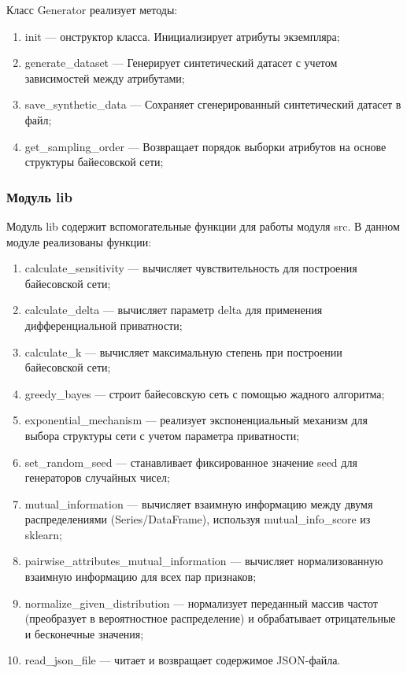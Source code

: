 Класс Generator реализует методы:

\begin{enumerate}[label*=---]
	\item init --- онструктор класса. Инициализирует атрибуты экземпляра;
	\item generate\_dataset --- Генерирует синтетический датасет с учетом зависимостей между атрибутами;
	\item save\_synthetic\_data --- Сохраняет сгенерированный синтетический датасет в файл;
	\item get\_sampling\_order --- Возвращает порядок выборки атрибутов на основе структуры байесовской сети;
\end{enumerate}

\subsubsection{Модуль lib}

Модуль lib содержит вспомогательные функции для работы модуля src.
В данном модуле реализованы функции:
\begin{enumerate}[label*=---]
	
	\item calculate\_sensitivity --- вычисляет чувствительность для построения байесовской сети;
	\item calculate\_delta --- вычисляет параметр delta для применения дифференциальной приватности;
	\item calculate\_k --- вычисляет максимальную степень при построении байесовской сети;
	\item greedy\_bayes --- строит байесовскую сеть с помощью жадного алгоритма;
	\item exponential\_mechanism --- реализует экспоненциальный механизм для выбора структуры сети с учетом параметра приватности;

	\item set\_random\_seed --- станавливает фиксированное значение seed для генераторов случайных чисел;
	\item mutual\_information --- вычисляет взаимную информацию между двумя распределениями (Series/DataFrame), используя mutual\_info\_score из sklearn;
	\item pairwise\_attributes\_mutual\_information --- вычисляет нормализованную взаимную информацию для всех пар признаков;
	\item normalize\_given\_distribution --- нормализует переданный массив частот (преобразует в вероятностное распределение) и обрабатывает отрицательные и бесконечные значения;
	\item read\_json\_file --- читает и возвращает содержимое JSON-файла.
\end{enumerate}
\newpage
